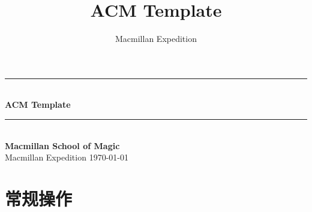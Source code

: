 \documentclass[twoside]{article}
\title{ACM Template}
\author{Macmillan Expedition}
\newcommand{\HRule}{\rule{\linewidth}{0.5mm}}
\begin{document}
\small
\begin{titlepage}
\begin{center}
\HRule \\ [1cm]
\textbf{\Huge{ACM Template}} \\ [0.5cm]
\HRule \\ [4cm]
\textbf{\Huge{Macmillan School of Magic}} \\ [1cm]
\LARGE{Macmillan Expedition}
\vfill
\Large{\today}
\end{center}
\clearpage
\end{titlepage}
\tableofcontents\clearpage
\pagestyle{fancy}
\lfoot{}
\cfoot{\thepage}\rfoot{}
\setcounter{section}{-1}
\setcounter{page}{1}
\clearpage\section{常规操作}
\end{document}
